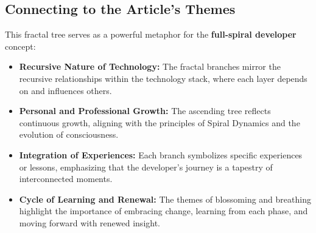 \documentclass[../../main.tex]{subfiles}
\begin{document}
    \subsection*{Connecting to the Article’s Themes}

    This fractal tree serves as a powerful metaphor for the \textbf{full-spiral developer} concept:

    \begin{itemize}
        \item \textbf{Recursive Nature of Technology:} The fractal branches mirror the recursive relationships within the technology stack, where each layer depends on and influences others.
        \item \textbf{Personal and Professional Growth:} The ascending tree reflects continuous growth, aligning with the principles of Spiral Dynamics and the evolution of consciousness.
        \item \textbf{Integration of Experiences:} Each branch symbolizes specific experiences or lessons, emphasizing that the developer’s journey is a tapestry of interconnected moments.
        \item \textbf{Cycle of Learning and Renewal:} The themes of blossoming and breathing highlight the importance of embracing change, learning from each phase, and moving forward with renewed insight.
    \end{itemize}
\end{document}
